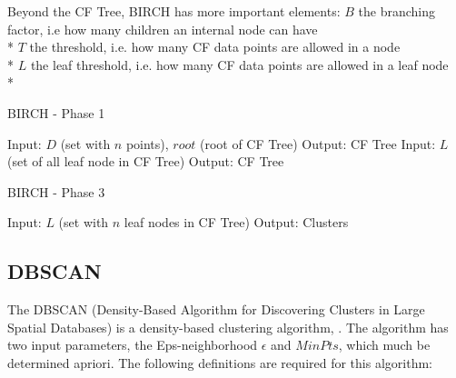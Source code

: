 \documentclass[conference, 10pt]{IEEEtran}
\begin{document}
  Beyond the CF Tree, BIRCH has more important elements:\vspace{1 mm}
  $B$ the branching factor, i.e how many children an internal node can have\\*
  $T$ the threshold, i.e. how many CF data points are allowed in a node\\*
  $L$ the leaf threshold, i.e. how many CF data points are allowed in a leaf node\\*

  \begin{algorithm}
  \caption{BIRCH - Phase 1}
  \begin{algorithmic}[1]
      \State Input: $D$ (set with $n$ points), $root$ (root of CF Tree)
      \State Output: CF Tree
          \Else
        \EndIf
      \EndFor
    \EndProcedure
      \State Input: $L$ (set of all leaf node in CF Tree)
      \State Output: CF Tree
    \EndProcedure
  \end{algorithmic}
  \end{algorithm}

  \begin{algorithm}
  \caption{BIRCH - Phase 3}
  \begin{algorithmic}[1]
      \State Input: $L$ (set with $n$ leaf nodes in CF Tree)
      \State Output: Clusters
        \EndIf
      \EndFor
    \EndProcedure
  \end{algorithmic}
  \end{algorithm}

  \subsection{DBSCAN}
  The DBSCAN (Density-Based Algorithm for Discovering Clusters in Large Spatial Databases) is a density-based clustering algorithm, . The algorithm has two input parameters, the Eps-neighborhood $\epsilon$ and $MinPts$, which much be determined apriori. The following definitions are required for this algorithm:
\end{document}
